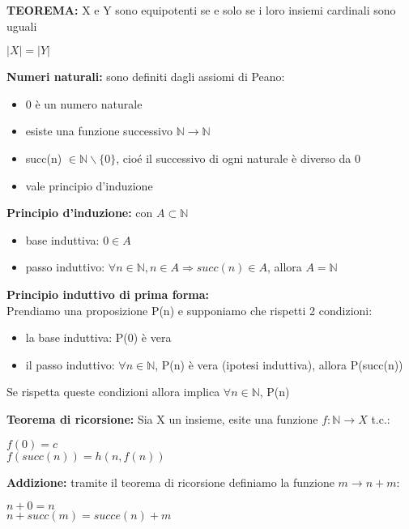 \documentclass[12pt, a4paper]{article}
\begin{document}
\textbf{TEOREMA:} X e Y sono equipotenti se e solo se i loro insiemi cardinali sono uguali
\begin{center}
    $|X|=|Y|$
\end{center}

\textbf{Numeri naturali:} sono definiti dagli assiomi di Peano:
\begin{itemize}
    \item 0 è un numero naturale
    \item esiste una funzione successivo $\mathbb{N}\rightarrow\mathbb{N}$
    \item succ(n) $\in\mathbb{N}\backslash\{0\}$, cioé il successivo di ogni naturale è diverso da 0
    \item vale principio d'induzione
\end{itemize}

\textbf{Principio d'induzione:} con $A\subset\mathbb{N}$ 
\begin{itemize}
    \item base induttiva: $0\in A$
    \item passo induttivo: $\forall n \in\mathbb{N}, n\in A\Rightarrow succ(n)\in A$, allora $A=\mathbb{N}$
\end{itemize}

\newpage

\textbf{Principio induttivo di prima forma:}\\
Prendiamo una proposizione P(n) e supponiamo che rispetti 2 condizioni:
\begin{itemize}
    \item la base induttiva: P(0) è vera
    \item il passo induttivo: $\forall n \in\mathbb{N}$, P(n) è vera (ipotesi induttiva), allora P(succ(n))
\end{itemize}
Se rispetta queste condizioni allora implica $\forall n\in\mathbb{N}$, P(n)

\textbf{Teorema di ricorsione:} Sia X un insieme, esite una funzione $f:\mathbb{N}\rightarrow X$ t.c.:
\begin{center}
    $f(0) = c$\\
    $f(succ(n))=h(n,f(n))$
\end{center}

\textbf{Addizione:} tramite il teorema di ricorsione definiamo la funzione $m\rightarrow n+m:$
\begin{center}
    $n + 0 = n$\\
    $n+succ(m)=succe(n)+m$
\end{center}
\end{document}

